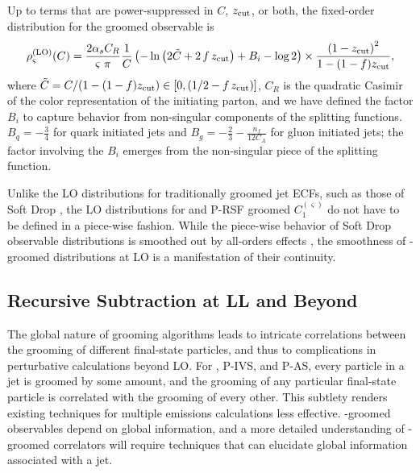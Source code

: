 Up to terms that are power-suppressed in \(C\), \(z_{\rm cut}\), or both, the fixed-order distribution for the groomed observable is
%
\begin{equation}
    \rho^{\rm(LO)}_{\varsigma}(C)
    =
    \frac{2\alpha_s C_R}{\varsigma~\pi}
    \frac{1}{C}
    \left(
        -\ln\left(2 \tilde C + 2\,f\,z_{\rm cut}\right)
        + B_i - \log 2
    \right)
    \times
    \frac{\left(1 - z_{\rm cut}\right)^2}{1 - (1-f)z_{\rm cut}},
    \label{eqn:piranha_LO}
\end{equation}
%
where \(\tilde C = C / (1 - (1-f)z_{\rm cut}) \in[0, (1/2-f\,z_{\rm cut})]\), \(C_R\) is the quadratic Casimir of the color representation of the initiating parton, and we have defined the factor \(B_i\) to capture behavior from non-singular components of the splitting functions.
%
\(B_q = -\frac{3}{4}\) for quark initiated jets and \(B_g = -\frac{2}{3} - \frac{n_f}{12 C_A}\) for gluon initiated jets;
%
the factor involving the \(B_i\) emerges from the non-singular piece of the splitting function.

Unlike the LO distributions for traditionally groomed jet ECFs, such as those of Soft Drop \cite{Larkoski:2014wba}, the LO distributions for  and P-RSF groomed \(C_1^{(\varsigma)}\) do not have to be defined in a piece-wise fashion.
%
%
While the piece-wise behavior of Soft Drop observable distributions is smoothed out by all-orders effects \cite{Benkendorfer:2021unv}, the smoothness of \PIRANHA{}-groomed distributions at LO is a manifestation of their continuity.
%


\subsection{Recursive Subtraction at LL and Beyond}
\label{app:resumresults}

The global nature of \PIRANHA{} grooming algorithms leads to intricate correlations between the grooming of different final-state particles, and thus to complications in perturbative calculations beyond LO.
%
For , P-IVS, and P-AS, every particle in a jet is groomed by some amount, and the grooming of any particular final-state particle is correlated with the grooming of every other.
%
This subtlety renders existing techniques for multiple emissions calculations less effective.
%
\PIRANHA{}-groomed observables depend on global information, and a more detailed understanding of \PIRANHA{}-groomed correlators will require techniques that can elucidate global information associated with a jet.


